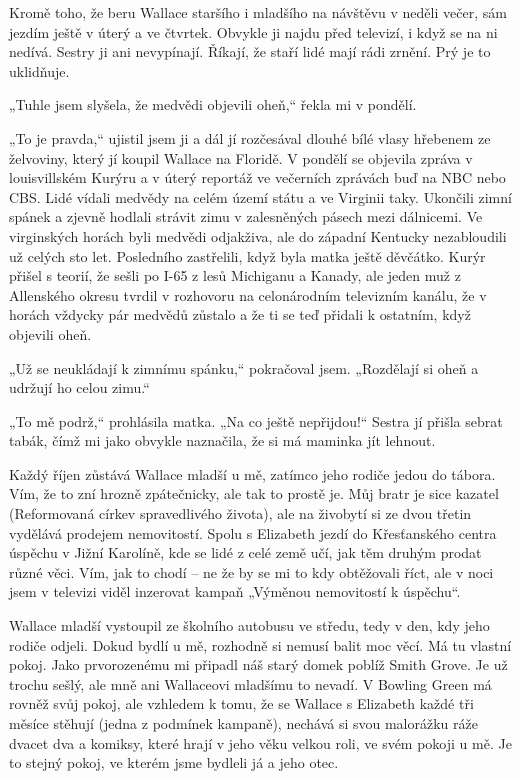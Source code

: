 Kromě toho, že beru Wallace staršího i mladšího na návštěvu v neděli večer, sám jezdím ještě v úterý a ve čtvrtek. Obvykle ji najdu před televizí, i když se na ni nedívá. Sestry ji ani nevypínají. Říkají, že staří lidé mají rádi zrnění. Prý je to uklidňuje.

„Tuhle jsem slyšela, že medvědi objevili oheň,“ řekla mi v pondělí.

„To je pravda,“ ujistil jsem ji a dál jí rozčesával dlouhé bílé vlasy hřebenem ze želvoviny, který jí koupil Wallace na Floridě. V pondělí se objevila zpráva v louisvillském  Kurýru  a v úterý reportáž ve večerních zprávách buď na NBC nebo CBS. Lidé vídali medvědy na celém území státu a ve Virginii taky. Ukončili zimní spánek a zjevně hodlali strávit zimu v zalesněných pásech mezi dálnicemi. Ve virginských horách byli medvědi odjakživa, ale do západní Kentucky nezabloudili už celých sto let. Posledního zastřelili, když byla matka ještě děvčátko.  Kurýr  přišel s teorií, že sešli po I-65 z lesů Michiganu a Kanady, ale jeden muž z Allenského okresu tvrdil v rozhovoru na celonárodním televizním kanálu, že v horách vždycky pár medvědů zůstalo a že ti se teď přidali k ostatním, když objevili oheň.

„Už se neukládají k zimnímu spánku,“ pokračoval jsem. „Rozdělají si oheň a udržují ho celou zimu.“

„To mě podrž,“ prohlásila matka. „Na co ještě nepřijdou!“ Sestra jí přišla sebrat tabák, čímž mi jako obvykle naznačila, že si má maminka jít lehnout.

\bigskip

\noindent
Každý říjen zůstává Wallace mladší u mě, zatímco jeho rodiče jedou do tábora. Vím, že to zní hrozně zpátečnicky, ale tak to prostě je. Můj bratr je sice kazatel (Reformovaná církev spravedlivého života), ale na živobytí si ze dvou třetin vydělává prodejem nemovitostí. Spolu s Elizabeth jezdí do Křesťanského centra úspěchu v Jižní Karolíně, kde se lidé z celé země učí, jak těm druhým prodat různé věci. Vím, jak to chodí – ne že by se mi to kdy obtěžovali říct, ale v noci jsem v televizi viděl inzerovat kampaň „Výměnou nemovitostí k úspěchu“.

Wallace mladší vystoupil ze školního autobusu ve středu, tedy v den, kdy jeho rodiče odjeli. Dokud bydlí u mě, rozhodně si nemusí balit moc věcí. Má tu vlastní pokoj. Jako prvorozenému mi připadl náš starý domek poblíž Smith Grove. Je už trochu sešlý, ale mně ani Wallaceovi mladšímu to nevadí. V Bowling Green má rovněž svůj pokoj, ale vzhledem k tomu, že se Wallace s Elizabeth každé tři měsíce stěhují (jedna z podmínek kampaně), nechává si svou malorážku ráže dvacet dva a komiksy, které hrají v jeho věku velkou roli, ve svém pokoji u mě. Je to stejný pokoj, ve kterém jsme bydleli já a jeho otec.

